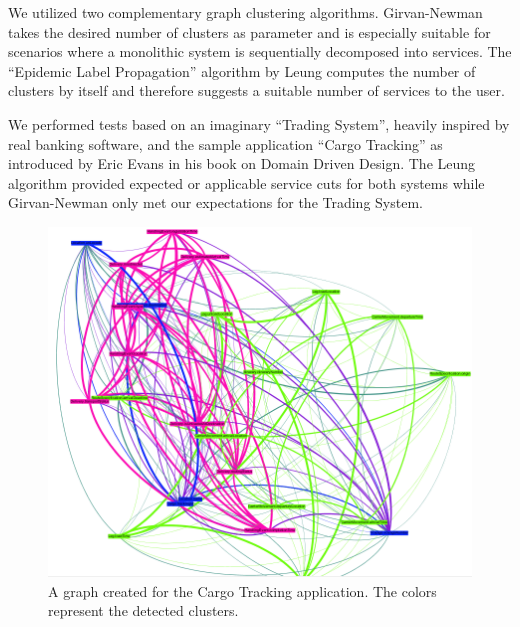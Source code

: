 \begin{minipage}[t]{0.6\textwidth}
	\setlength{\parskip}{5pt plus 0.1pt}
We utilized two complementary graph clustering algorithms. Girvan-Newman takes the desired number of clusters as parameter and is especially suitable for scenarios where a monolithic system is sequentially decomposed into services. The \enquote{Epidemic Label Propagation} algorithm by Leung computes the number of clusters by itself and therefore suggests a suitable number of services to the user. 

We performed tests based on an imaginary \enquote{Trading System}, heavily inspired by real banking software, and the sample application \enquote{Cargo Tracking} as introduced by Eric Evans in his book on Domain Driven Design. The Leung algorithm provided expected or applicable service cuts for both systems while Girvan-Newman only met our expectations for the Trading System. 
\end{minipage}
\begin{minipage}[t]{0.4\textwidth}	
	\begin{figure}[H]
		\begin{center}
			\includegraphics[scale=0.3]{images/ddd_semantic_proximity_debug.png}
			\caption{A graph created for the Cargo Tracking application. The colors represent the detected clusters.}
			\label{fig:mgmt-summary-graph}
		\end{center}
	\end{figure}
\end{minipage}

